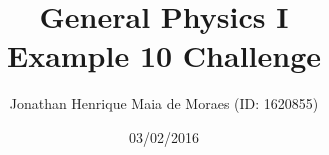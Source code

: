 \title{General Physics I \\ Example 10 Challenge}
\author{Jonathan Henrique Maia de Moraes (ID: 1620855)}
\date{03/02/2016}
\maketitle

